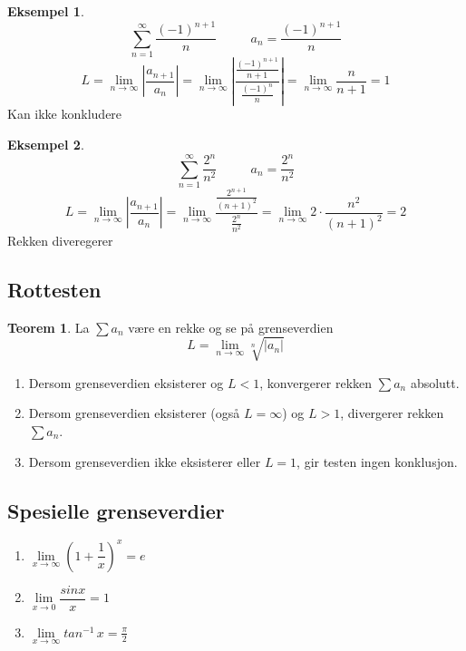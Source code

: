 \documentclass[11pt]{article}
\theoremstyle{definition}
\theoremstyle{definition}
\newtheorem{mitteks}{Eksempel}[section]
\theoremstyle{definition}
\theoremstyle{definition}
\newtheorem{teo}{Teorem}[section]
\newenvironment{fteo}
{\begin{mdframed}[style=minstil]\begin{teo}}
		{\end{teo}\end{mdframed}}
\theoremstyle{definition}
\theoremstyle{definition}
\begin{document}
		 \begin{mitteks}
			\[\sum_{n=1}^{\infty}\dfrac{(-1)^{n+1}}{n}\hspace{32pt}a_n=\dfrac{(-1)^{n+1}}{n} \]
			\[L=\lim_{n \rightarrow \infty}\left| \dfrac{a_{n+1}}{a_n} \right|= \lim_{n \rightarrow \infty}\left| \dfrac{\frac{(-1)^{n+1}}{n+1}}{\frac{(-1)^n}{n}}\right|=\lim_{n \rightarrow \infty}\dfrac{n}{n+1}=1\]
		 	Kan ikke konkludere
		 \end{mitteks}
		 		
		 		\newpage
		 		
		 \begin{mitteks}
		 	\[\sum_{n=1}^{\infty}\dfrac{2^n}{n^2}\hspace{32pt}a_n =\dfrac{2^n}{n^2}\]
		 	\[L=\lim_{n \rightarrow \infty}\left| \dfrac{a_{n+1}}{a_n} \right|=\lim_{n \rightarrow \infty}\dfrac{\frac{2^{n+1}}{(n+1)^2}}{\frac{2^n}{n^2}}=\lim_{n \rightarrow \infty}2\cdot \dfrac{n^2}{(n+1)^2}=2\]
		 	Rekken diveregerer
		 \end{mitteks}
		 		
		 \newpage
		 
		 \subsection{Rottesten}
		 \begin{fteo}
		 	La \(\sum a_n\) være en rekke og se på grenseverdien 
		 	\[L=\lim\limits_{n\rightarrow \infty} \sqrt[n]{|a_n|} \]
		 	
		 	\begin{enumerate}
		 		\item Dersom grenseverdien eksisterer og \(L<1 \), konvergerer rekken \(\sum a_n \) absolutt.
		 		\item Dersom grenseverdien eksisterer (også \(L=\infty \)) og \(L>1 \), divergerer rekken \(\sum a_n \).
		 		\item Dersom grenseverdien ikke eksisterer eller \(L=1 \), gir testen ingen konklusjon.
		 	\end{enumerate}
		 \end{fteo}
		 
		 \newpage
		 
		 \subsection{Spesielle grenseverdier}
		 
		 \begin{enumerate}
		 	\item \(\lim\limits_{x\rightarrow \infty}\left(1+\dfrac{1}{x}\right)^{x}=e\)
		 	
		 	\item \(\lim\limits_{x\rightarrow 0}\dfrac{sinx}{x}=1\)
		 	
		 	\item \(\lim\limits_{x\rightarrow \infty}tan^{-1}\,x=\frac{\pi}{2} \)
		 \end{enumerate}
		\newpage
		
\end{document}
